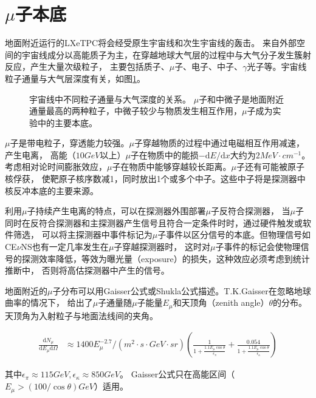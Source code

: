 \section{$\mu$子本底}

地面附近运行的LXeTPC将会经受原生宇宙线和次生宇宙线的轰击。
来自外部空间的宇宙线成分以高能质子为主，在穿越地球大气层的过程中与大气分子发生簇射反应，产生大量次级粒子，
主要包括质子、$\mu$子、电子、中子、$\gamma$光子等。宇宙线粒子通量与大气层深度有关，如图\ref{fig:vertical_flux}。

\begin{figure}
    \centering
    
    \caption{\label{fig:vertical_flux} 宇宙线中不同粒子通量与大气深度的关系\cite{olive_review_2016}。
    $\mu$子和中微子是地面附近通量最高的两种粒子，中微子较少与物质发生相互作用，$\mu$子成为实验中的主要本底。}
\end{figure}

$\mu$子是带电粒子，穿透能力较强。$\mu$子穿越物质的过程中通过电磁相互作用减速，产生电离，
高能（$10\si{GeV}$以上）$\mu$子在物质中的能损$-\mathrm{d}E/\mathrm{d}x$大约为$2\si{MeV\cdot cm^{-1}}$。
考虑相对论时间膨胀效应，$\mu$子在物质中能够穿越较长距离。$\mu$子还有可能被原子核俘获，
使靶原子核序数减1，同时放出1个或多个中子。这些中子将是探测器中核反冲本底的主要来源。

利用$\mu$子持续产生电离的特点，可以在探测器外围部署$\mu$子反符合探测器，
当$\mu$子同时在反符合探测器和主探测器产生信号且符合一定条件时时，通过硬件触发或软件筛选，
可以将主探测器中事件标记为$\mu$子事件以区分信号的本底。但物理信号如CE$\nu$NS也有一定几率发生在$\mu$子穿越探测器时，
这时对$\mu$子事件的标记会使物理信号的探测效率降低，等效为曝光量（exposure）的损失，这种效应必须考虑到统计推断中，
否则将高估探测器中产生的信号。

地面附近的$\mu$子分布可以用Gaisser公式或Shukla公式描述。T.K.Gaisser在忽略地球曲率的情况下，
给出了$\mu$子通量随$\mu$子能量$E_\mu$和天顶角（zenith angle）$\theta$的分布。天顶角为入射粒子与地面法线间的夹角\cite{gaisser_cosmic_2016}。

\begin{align}
    \label{eq:gaisser}
    \frac{\mathrm{d}N_\mu}{\mathrm{d}E_\mu\mathrm{d}\Omega} &\approx 
    1400E_\mu^{-2.7}/\left(\si{m^2\cdot s\cdot GeV\cdot sr}\right)\left(\frac{1}{1+\frac{1.1E_\mu\cos\theta}{\epsilon_\pi}}+\frac{0.054}{1+\frac{1.1E_\mu\cos\theta}{\epsilon_\kappa}}\right)
\end{align}

其中$\epsilon_\pi\approx115\si{GeV},\epsilon_\kappa\approx850\si{GeV}$。
Gaisser公式只在高能区间（$E_\mu>(100/\cos\theta)\si{GeV}$）适用。

